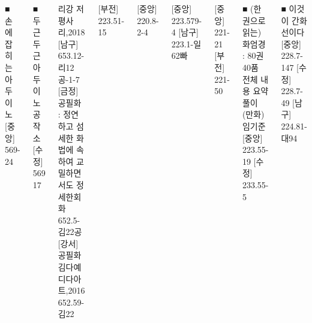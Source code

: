 \documentclass[	20pt, 
							a1paper, 
							landscape, %
							margin=0mm, %
							innermargin=10mm,  		%
							blockverticalspace=4mm, %
							colspace=5mm, 
							subcolspace=0mm
							]{tikzposter}
\begin{document}
\begin{columns}
			\block 
			{■  손에 잡히는 아두이노}
			{				
			[중앙] 569-24
			}

			\block 
			{■  두근두근 아두이노 공작소 }
			{				
			[수정] 569 17
			}

			{				
			리강 저 평사리,2018
			[남구] 653.12-리12공-1-7 
			[금정] 공필화 : 정연하고 섬세한 화법에 속하여 교밀하면서도 정세한회화 652.5-김22공
			[강서]  공필화 김다예 디다아트,2016 652.59-김22
			}



		{
[부전] 223.51-15
		}		


		{
[중앙] 220.8-2-4
		}		


		{
[중앙] 223.579-4
[남구] 223.1-일62빠
		}		



		{
[중앙] 221-21
[부전] 221-50
		}		






			\block 
			{■ (한 권으로 읽는)화엄경 : 80권 40품 전체 내용 요약 풀이(만화) 임기준}
			{				
			[중앙] 223.55-19
			[수정]  233.55-5
		}




			\block 
			{■ 이것이 간화선이다 }
			{				
			[중앙]  228.7-147
			[수정] 228.7-49
			[남구] 224.81-대94
		}


\end{columns}
\end{document}
